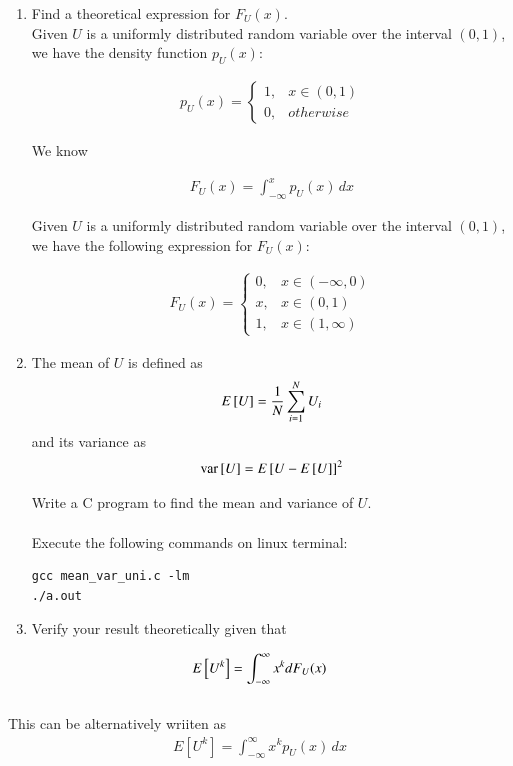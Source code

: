 \documentclass[journal,12pt,twocolumn]{IEEEtran}
\renewcommand\thesection{\arabic{section}}
\begin{document}
\begin{enumerate}[label=\thesection.\arabic*
,ref=\thesection.\theenumi]
%
\item
Find a theoretical expression for $F_{U}(x)$.
\\
\solution Given $U$ is a uniformly distributed random variable over the interval $(0, 1)$, we have the density function $p_U(x)$:

	\begin{align}
		p_U(x) = 
		\begin{cases}
			1, & x \in (0, 1) \\
			0, & otherwise
		\end{cases}
		\label{eq:PDF_U}
	\end{align}
	
	We know

	\begin{align}
		F_U(x) = \int_{-\infty}^{x} p_U(x) \,dx
		\label{eq:Relation}
	\end{align}
	
	Given $U$ is a uniformly distributed random variable over the interval $(0, 1)$, we have the following expression for $F_U(x)$:
	
	\begin{align}
		F_U(x) = 
		\begin{cases}
			0, & x \in (-\infty, 0) \\
      			x, & x \in (0, 1) \\
      			1, & x \in (1, \infty)
    		\end{cases}
	\end{align}

\item
The mean of $U$ is defined as
%
\begin{equation}
E{}\left[U\right] = \frac{1}{N}\sum_{i=1}^{N}U_i
\end{equation}
%
and its variance as
%
\begin{equation}
\text{var}{}\left[U\right] = E{}\left[U- E{}\left[U\right]\right]^2 
\end{equation}

Write a C program to  find the mean and variance of $U$.
\\
\solution
\\
Execute the following commands on linux terminal:
\begin{lstlisting}
gcc mean_var_uni.c -lm
./a.out
\end{lstlisting}

\item Verify your result theoretically given that
\end{enumerate}
%
\begin{align}
E{}\left[U^k\right] = \int_{-\infty}^{\infty}x^kdF_{U}(x)
\end{align}
\\
\solution
This can be alternatively wriiten as
	\begin{align}
		E[U^k] = \int^{\infty}_{-\infty} x^k p_U(x) \,dx
		\label{eq: Expected}
	\end{align}
\end{document}
